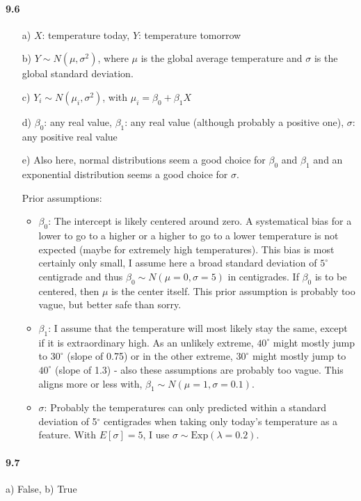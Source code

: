 \documentclass[fontsize=11pt,DIV=18,parskip=half]{scrartcl}
\begin{document}
\paragraph{9.6} 
\begin{itemize}
\item[a)] $X$: temperature today, $Y$: temperature tomorrow
\item[b)] $Y \sim N(\mu, \sigma^2)$, where $\mu$ is the global average temperature and $\sigma$ is the global standard deviation.
\item[c)] $Y_i \sim N(\mu_i, \sigma^2)$, with $\mu_i = \beta_0 + \beta_1 X$
\item[d)] $\beta_0$: any real value, $\beta_1$: any real value (although probably a positive one), $\sigma$: any positive real value
\item[e)] Also here, normal distributions seem a good choice for $\beta_0$ and $\beta_1$ and an exponential distribution seems a good choice for $\sigma$.

Prior assumptions:
\begin{itemize}
\item $\beta_0$: The intercept is likely centered around zero. A systematical bias for a lower to go to a higher or a higher to go to a lower temperature is not expected (maybe for extremely high temperatures). This bias is most certainly only small, I assume here a broad standard deviation of $5^\circ$ centigrade and thus $\beta_0 \sim N(\mu=0, \sigma=5)$ in centigrades. If $\beta_0$ is to be centered, then $\mu$ is the center itself. This prior assumption is probably too vague, but better safe than sorry.
\item $\beta_1$: I assume that the temperature will most likely stay the same, except if it is extraordinary high. As an unlikely extreme, $40^\circ$ might mostly jump to $30^\circ$ (slope of 0.75) or in the other extreme, $30^\circ$ might mostly jump to $40^\circ$ (slope of 1.3) - also these assumptions are probably too vague. This aligns more or less with, $\beta_1 \sim N(\mu=1, \sigma=0.1)$.
\item $\sigma$: Probably the temperatures can only predicted within a standard deviation of 5$^\circ$ centigrades when taking only today's temperature as a feature. With $E[\sigma] = 5$, I use $\sigma \sim \text{Exp}(\lambda = 0.2)$.
\end{itemize}

\end{itemize}

\paragraph{9.7} a) False, b) True
\end{document}
